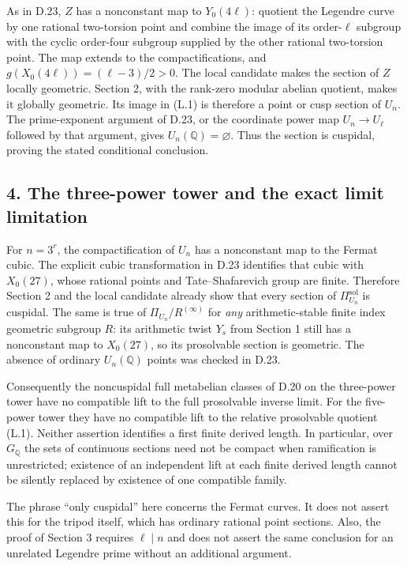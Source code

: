 As in D.23, $Z$ has a nonconstant map to $Y_0(4\ell)$: quotient
the Legendre curve by one rational two-torsion point and combine
the image of its order-$\ell$ subgroup with the cyclic order-four
subgroup supplied by the other rational two-torsion point.
The map extends to the compactifications, and
$g(X_0(4\ell))=(\ell-3)/2>0$.  The local candidate makes the
section of $Z$ locally geometric.  Section 2, with the rank-zero
modular abelian quotient, makes it globally geometric.  Its image
in (L.1) is therefore a point or cusp section of $U_n$.
The prime-exponent argument of D.23, or the coordinate power map
$U_n\to U_\ell$ followed by that argument, gives $U_n(\mathbb Q)=
\varnothing$.  Thus the section is cuspidal, proving the stated
conditional conclusion.

\subsection*{4. The three-power tower and the exact limit limitation}

For $n=3^r$, the compactification of $U_n$ has a nonconstant map
to the Fermat cubic.  The explicit cubic transformation in D.23
identifies that cubic with $X_0(27)$, whose rational points and
Tate--Shafarevich group are finite.  Therefore Section 2 and the
local candidate already show that every section of
$\Pi_{U_n}^{\mathrm{sol}}$ is cuspidal.  The same is true of
$\Pi_{U_n}/R^{(\infty)}$ for \emph{any} arithmetic-stable finite
index geometric subgroup $R$: its arithmetic twist $Y_s$ from
Section 1 still has a nonconstant map to $X_0(27)$, so its
prosolvable section is geometric.  The absence of ordinary
$U_n(\mathbb Q)$ points was checked in D.23.

Consequently the noncuspidal full metabelian classes of D.20 on
the three-power tower have no compatible lift to the full
prosolvable inverse limit.  For the five-power tower they have no
compatible lift to the relative prosolvable quotient (L.1).
Neither assertion identifies a first finite derived length.
In particular, over $G_{\mathbb Q}$ the sets of continuous sections
need not be compact when ramification is unrestricted; existence
of an independent lift at each finite derived length cannot be
silently replaced by existence of one compatible family.

The phrase ``only cuspidal'' here concerns the Fermat curves.
It does not assert this for the tripod itself, which has ordinary
rational point sections.  Also, the proof of Section 3 requires
$\ell\mid n$ and does not assert the same conclusion for an
unrelated Legendre prime without an additional argument.

